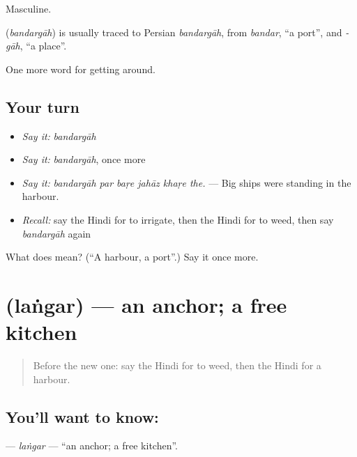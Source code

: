 Masculine.

\begin{cousinweb}
\textbf{} (\emph{bandargāh}) is usually traced to Persian \emph{bandargāh}, from \emph{bandar}, \textquotedblleft{}a port\textquotedblright{}, and \emph{-gāh}, \textquotedblleft{}a place\textquotedblright{}.
\end{cousinweb}

\begin{grammarlens}[title={What you've built}]
One more word for getting around.
\end{grammarlens}

\subsection*{Your turn}
\begin{itemize}
\raggedright
  \item \emph{Say it:} \emph{bandargāh}
  \item \emph{Say it:} \emph{bandargāh}, once more
  \item \emph{Say it:} \emph{bandargāh par baṛe jahāz khaṛe the.} — Big ships were standing in the harbour.
  \item \emph{Recall:} say the Hindi for to irrigate, then the Hindi for to weed, then say \emph{bandargāh} again
\end{itemize}

\begin{tcolorbox}[breakable,colback=teal!4,colframe=teal!35!black,title={Before you move on}]
What does  mean? (\textquotedblleft{}A harbour, a port\textquotedblright{}.) Say it once more.
\end{tcolorbox}
\section[\texorpdfstring{\hi{लंगर} (laṅgar)}{लंगर (laṅgar)}]{ (laṅgar) — an anchor; a free kitchen}

\label{lesson:HI-C444-langar}



\begin{quote}
Before the new one: say the Hindi for to weed, then the Hindi for a harbour.
\end{quote}

\subsection*{You'll want to know: }
\textbf{} — \emph{laṅgar} — \textquotedblleft{}an anchor; a free kitchen\textquotedblright{}.

